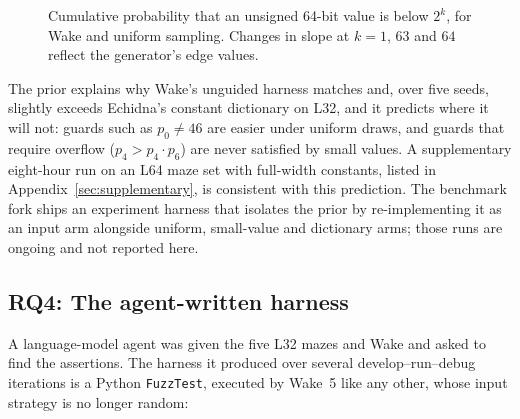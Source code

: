 \documentclass[11pt,a4paper]{article}
\newcommand{\wake}{Wake}
\begin{document}
\priortable
\begin{figure}[t]
\centering
{}
\caption{Cumulative probability that an unsigned 64-bit value is below $2^k$, for \wake{} and uniform sampling. Changes in slope at $k=1$, $63$ and $64$ reflect the generator's edge values.}
\label{fig:prior}
\end{figure}

The prior explains why \wake{}'s unguided harness matches and, over five seeds, slightly exceeds Echidna's constant dictionary on L32, and it predicts where it will not: guards such as $p_0\neq 46$ are easier under uniform draws, and guards that require overflow ($p_4 > p_4\cdot p_6$) are never satisfied by small values. A supplementary eight-hour run on an L64 maze set with full-width constants, listed in Appendix~\ref{sec:supplementary}, is consistent with this prediction. The benchmark fork ships an experiment harness that isolates the prior by re-implementing it as an input arm alongside uniform, small-value and dictionary arms; those runs are ongoing and not reported here.

\subsection{RQ4: The agent-written harness}
\label{sec:agent}

A language-model agent was given the five L32 mazes and \wake{} and asked to find the assertions. The harness it produced over several develop--run--debug iterations is a Python \texttt{FuzzTest}, executed by \wake{}~5 like any other, whose input strategy is no longer random:
\end{document}
